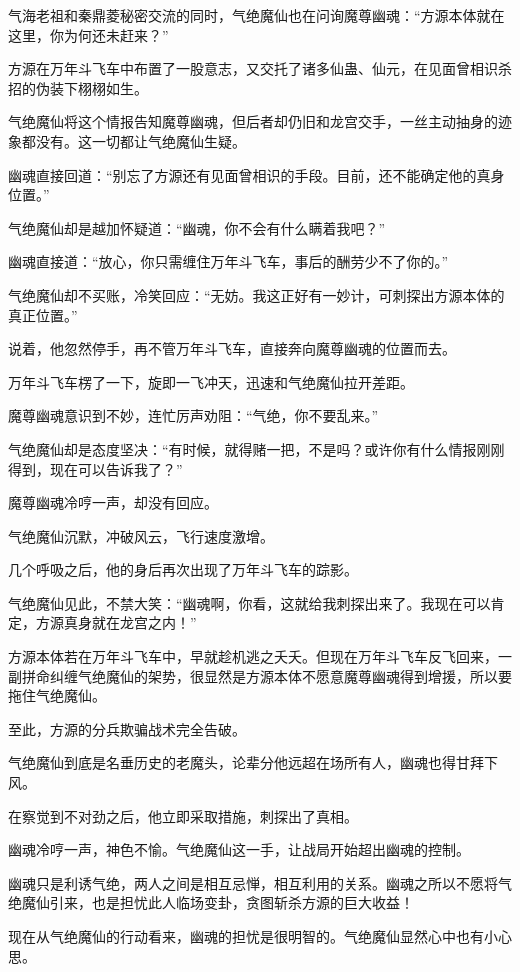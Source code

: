 \begin{this_body}
气海老祖和秦鼎菱秘密交流的同时，气绝魔仙也在问询魔尊幽魂：“方源本体就在这里，你为何还未赶来？”

方源在万年斗飞车中布置了一股意志，又交托了诸多仙蛊、仙元，在见面曾相识杀招的伪装下栩栩如生。

气绝魔仙将这个情报告知魔尊幽魂，但后者却仍旧和龙宫交手，一丝主动抽身的迹象都没有。这一切都让气绝魔仙生疑。

幽魂直接回道：“别忘了方源还有见面曾相识的手段。目前，还不能确定他的真身位置。”

气绝魔仙却是越加怀疑道：“幽魂，你不会有什么瞒着我吧？”

幽魂直接道：“放心，你只需缠住万年斗飞车，事后的酬劳少不了你的。”

气绝魔仙却不买账，冷笑回应：“无妨。我这正好有一妙计，可刺探出方源本体的真正位置。”

说着，他忽然停手，再不管万年斗飞车，直接奔向魔尊幽魂的位置而去。

万年斗飞车楞了一下，旋即一飞冲天，迅速和气绝魔仙拉开差距。

魔尊幽魂意识到不妙，连忙厉声劝阻：“气绝，你不要乱来。”

气绝魔仙却是态度坚决：“有时候，就得赌一把，不是吗？或许你有什么情报刚刚得到，现在可以告诉我了？”

魔尊幽魂冷哼一声，却没有回应。

气绝魔仙沉默，冲破风云，飞行速度激增。

几个呼吸之后，他的身后再次出现了万年斗飞车的踪影。

气绝魔仙见此，不禁大笑：“幽魂啊，你看，这就给我刺探出来了。我现在可以肯定，方源真身就在龙宫之内！”

方源本体若在万年斗飞车中，早就趁机逃之夭夭。但现在万年斗飞车反飞回来，一副拼命纠缠气绝魔仙的架势，很显然是方源本体不愿意魔尊幽魂得到增援，所以要拖住气绝魔仙。

至此，方源的分兵欺骗战术完全告破。

气绝魔仙到底是名垂历史的老魔头，论辈分他远超在场所有人，幽魂也得甘拜下风。

在察觉到不对劲之后，他立即采取措施，刺探出了真相。

幽魂冷哼一声，神色不愉。气绝魔仙这一手，让战局开始超出幽魂的控制。

幽魂只是利诱气绝，两人之间是相互忌惮，相互利用的关系。幽魂之所以不愿将气绝魔仙引来，也是担忧此人临场变卦，贪图斩杀方源的巨大收益！

现在从气绝魔仙的行动看来，幽魂的担忧是很明智的。气绝魔仙显然心中也有小心思。


\end{this_body}

